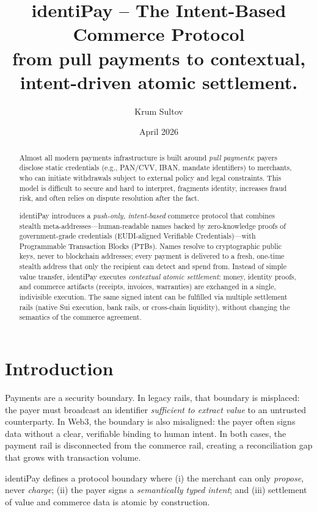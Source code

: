 \documentclass[11pt]{article}
\title{\textbf{identiPay -- The Intent-Based Commerce Protocol}\\
\large from pull payments to contextual, intent-driven atomic settlement.}
\author{Krum Sultov}
\date{April 2026}
\begin{document}
\maketitle

\begin{abstract}
Almost all modern payments infrastructure is built around \emph{pull payments}: payers disclose static credentials (e.g., PAN/CVV, IBAN, mandate identifiers) to merchants, who can initiate withdrawals subject to external policy and legal constraints. This model is difficult to secure and hard to interpret, fragments identity, increases fraud risk, and often relies on dispute resolution after the fact.

identiPay introduces a \emph{push-only, intent-based} commerce protocol that combines stealth meta-addresses---human-readable names backed by zero-knowledge proofs of government-grade credentials (EUDI-aligned Verifiable Credentials)---with Programmable Transaction Blocks (PTBs). Names resolve to cryptographic public keys, never to blockchain addresses; every payment is delivered to a fresh, one-time stealth address that only the recipient can detect and spend from. Instead of simple value transfer, identiPay executes \emph{contextual atomic settlement}: money, identity proofs, and commerce artifacts (receipts, invoices, warranties) are exchanged in a single, indivisible execution. The same signed intent can be fulfilled via multiple settlement rails (native Sui execution, bank rails, or cross-chain liquidity), without changing the semantics of the commerce agreement.
\end{abstract}

\tableofcontents
\newpage

\section{Introduction}
Payments are a security boundary. In legacy rails, that boundary is misplaced: the payer must broadcast an identifier \emph{sufficient to extract value} to an untrusted counterparty. In Web3, the boundary is also misaligned: the payer often signs data without a clear, verifiable binding to human intent. In both cases, the payment rail is disconnected from the commerce rail, creating a reconciliation gap that grows with transaction volume.

identiPay defines a protocol boundary where (i) the merchant can only \emph{propose}, never \emph{charge}; (ii) the payer signs a \emph{semantically typed intent}; and (iii) settlement of value and commerce data is atomic by construction.
\end{document}
